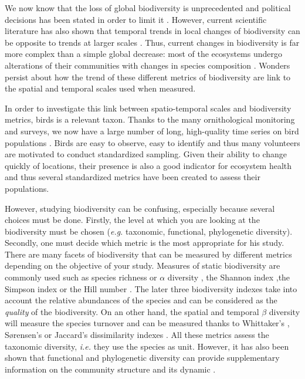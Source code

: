 \documentclass[
  12pt,
  oneside]{report}
\begin{document}
We now know that the loss of global biodiversity is unprecedented and political decisions has been stated in order to limit it \autocite[\emph{e.g.}][2010, 2002]{secretariat_of_the_convention_on_biological_diversity_global_2006}. However, current scientific literature has also shown that temporal trends in local changes of biodiversity can be opposite to trends at larger scales \autocite[\emph{e.g.}][]{chase_species_2019}. Thus, current changes in biodiversity is far more complex than a simple global decrease: most of the ecosystems undergo alterations of their communities with changes in species composition \autocite{blowes_geography_2019,dornelas_quantifying_2013}. Wonders persist about how the trend of these different metrics of biodiversity are link to the spatial and temporal scales used when measured.

In order to investigate this link between spatio-temporal scales and biodiversity metrics, birds is a relevant taxon. Thanks to the many ornithological monitoring and surveys, we now have a large number of long, high-quality time series on bird populations \autocites{bejcek_velke_2016,sauer_north_2013,kamp_population_2021}. Birds are easy to observe, easy to identify and thus many volunteers are motivated to conduct standardized sampling. Given their ability to change quickly of locations, their presence is also a good indicator for ecosystem health and thus several standardized metrics have been created to assess their populations.

However, studying biodiversity can be confusing, especially because several choices must be done. Firstly, the level at which you are looking at the biodiversity must be chosen (\emph{e.g.} taxonomic, functional, phylogenetic diversity). Secondly, one must decide which metric is the most appropriate for his study. There are many facets of biodiversity that can be measured by different metrics depending on the objective of your study. Measures of static biodiversity are commonly used such as species richness or \(\alpha\) diversity \autocite[\emph{i.e.} number of species,][]{whittaker_vegetation_1960}, the Shannon index \autocite{shannon_mathematical_1948} ,the Simpson index \autocite{simpson_measurement_1949} or the Hill number \autocite{hill_diversity_1973}. The later three biodiversity indexes take into account the relative abundances of the species and can be considered as the \emph{quality} of the biodiversity. On an other hand, the spatial and temporal \(\beta\) diversity will measure the species turnover and can be measured thanks to Whittaker's \autocite{whittaker_evolution_1972}, Sørensen's \autocite{sorensen_method_1948} or Jaccard's \autocite{jaccard_distribution_1912} dissimilarity indexes \autocite[\emph{e.g.}][]{keil_patterns_2012}. All these metrics assess the taxonomic diversity, \emph{i.e.} they use the species as unit. However, it has also been shown that functional and phylogenetic diversity can provide supplementary information on the community structure and its dynamic \autocites[\emph{e.g.}][]{mcgill_rebuilding_2006,mouquet_ecophylogenetics_2012,webb_phylogenies_2002}.
\end{document}
